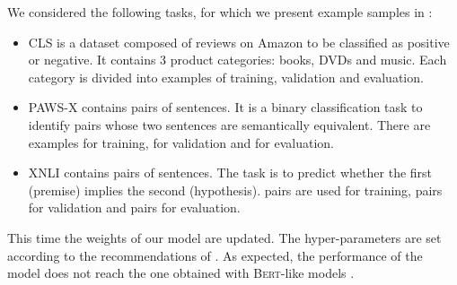 We considered the following tasks, for which we present example samples in :
\begin{itemize}
    \item CLS is a dataset composed of reviews on Amazon to be classified as positive or negative. It contains 3 product categories: books, DVDs and music. Each category is divided into  examples of training, validation and evaluation. 
    \item PAWS-X contains pairs of sentences. It is a binary classification task to identify pairs whose two sentences are semantically equivalent. There are  examples for training,  for validation and  for evaluation.
    \item XNLI contains pairs of sentences. The task is to predict whether the first (premise) implies the second (hypothesis).  pairs are used for training,  pairs for validation and  pairs for evaluation.
\end{itemize}

This time the weights of our model are updated. The hyper-parameters are set according to the recommendations of \textcite{le_20b, le_20a}. As expected, the performance of the model does not reach the one obtained with \textsc{Bert}-like models . 

\begin{table}[!ht]
\footnotesize
{}
\caption{Accuracy scores for the discriminative tasks of the FLUE benchmark. The symbol $\dagger$ denotes the reported scores of \textcite{le_20a, le_20b}. We indicate the best results in each section in \textbf{bold}, we \underline{underline} the best results overall.}
\end{table}

